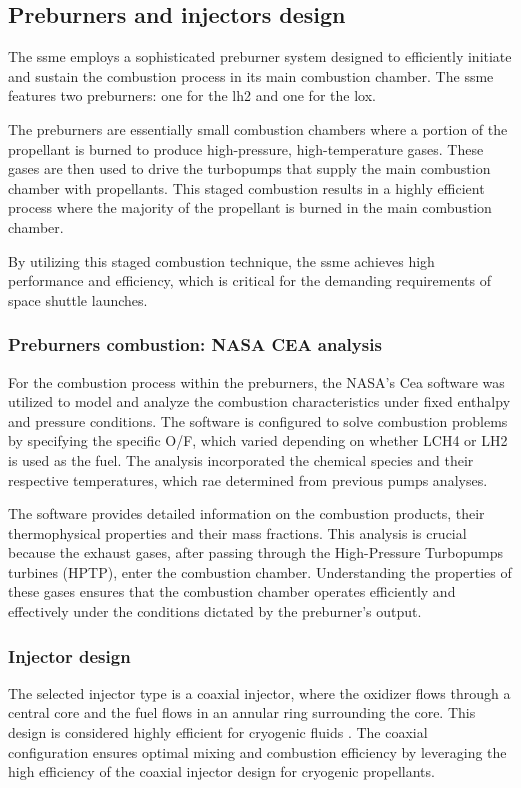 \subsection{Preburners and injectors design}

The \acrfull{ssme} employs a sophisticated preburner system designed to efficiently initiate and sustain the combustion process in its main combustion chamber. The \acrshort{ssme} features two preburners: one for the \acrfull{lh2} and one for the \acrfull{lox}.

The preburners are essentially small combustion chambers where a portion of the propellant is burned to produce high-pressure, high-temperature gases. These gases are then used to drive the turbopumps that supply the main combustion chamber with propellants.
This staged combustion results in a highly efficient process where the majority of the propellant is burned in the main combustion chamber.

By utilizing this staged combustion technique, the \acrshort{ssme} achieves high performance and efficiency, which is critical for the demanding requirements of space shuttle launches.

\subsubsection{Preburners combustion: NASA CEA analysis}
For the combustion process within the preburners, the NASA's \acrshort{Cea} software was utilized to model and analyze the combustion characteristics under fixed enthalpy and pressure conditions. The software is configured to solve combustion problems by specifying the specific \acrfull{O/F}, which varied depending on whether \acrlong{LCH4} or \acrlong{LH2} is used as the fuel. The analysis incorporated the chemical species and their respective temperatures, which rae determined from previous pumps analyses.

 The software provides detailed information on the combustion products, their thermophysical properties and their mass fractions. 
 This analysis is crucial because the exhaust gases, after passing through the High-Pressure Turbopumps turbines (HPTP), enter the combustion chamber.
 Understanding the properties of these gases ensures that the combustion chamber operates efficiently and effectively under the conditions dictated by the preburner’s output.

\subsubsection{Injector design}
The selected injector type is a coaxial injector, where the oxidizer flows through a central core and the fuel flows in an annular ring surrounding the core. 
This design is considered highly efficient for cryogenic fluids \cite{sutton01}. 
The coaxial configuration ensures optimal mixing and combustion efficiency by leveraging the high efficiency of the coaxial injector design for cryogenic propellants.


